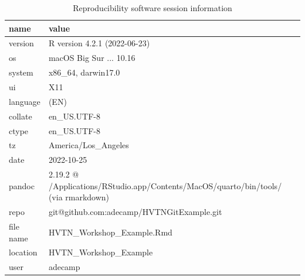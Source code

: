 \documentclass[11pt]{article}
\begin{document}
\begin{table}

\caption{\label{tab:Software-Session-Information}Reproducibility software session information}
\centering
\fontsize{10}{12}\selectfont
\begin{tabular}[t]{ll}
\toprule
name & value\\
\midrule
version & R version 4.2.1 (2022-06-23)\\
os & macOS Big Sur ... 10.16\\
system & x86\_64, darwin17.0\\
ui & X11\\
language & (EN)\\
collate & en\_US.UTF-8\\
ctype & en\_US.UTF-8\\
tz & America/Los\_Angeles\\
date & 2022-10-25\\
pandoc & 2.19.2 @ /Applications/RStudio.app/Contents/MacOS/quarto/bin/tools/ (via rmarkdown)\\
repo & git@github.com:adecamp/HVTNGitExample.git\\
file name & HVTN\_Workshop\_Example.Rmd\\
location & HVTN\_Workshop\_Example\\
user & adecamp\\
\bottomrule
\end{tabular}
\end{table}
\end{document}
